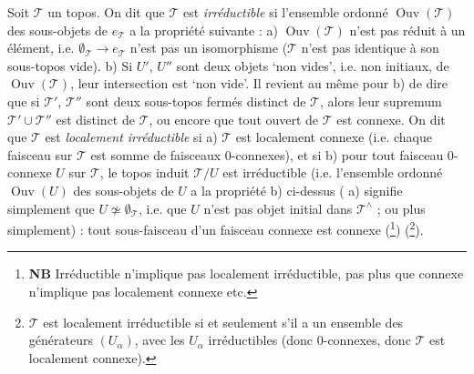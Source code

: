 Soit $\mathcal{T}$ un topos. On dit que $\mathcal{T}$ est \textit{irréductible} si l'ensemble ordonné $\operatorname{Ouv}(\mathcal{T})$ des sous-objets de $e_{\mathcal{T}}$ a la propriété suivante : a) $\operatorname{Ouv}(\mathcal{T})$ n'est pas réduit à un élément, i.e. $\emptyset_{\mathcal{T}} \longrightarrow e_{\mathcal{T}}$ n'est pas un isomorphisme ($\mathcal{T}$ n'est pas identique à son sous-topos vide). b) Si $U'$, $U''$ sont deux objets `non vides', i.e. non initiaux, de $\operatorname{Ouv}(\mathcal{T})$, leur intersection est `non vide'. Il revient au même pour b) de dire que si $\mathcal{T}'$, $\mathcal{T}''$ sont deux sous-topos fermés distinct de $\mathcal{T}$, alors leur supremum $\mathcal{T}' \cup \mathcal{T}''$ est distinct de $\mathcal{T}$, ou encore que tout ouvert de $\mathcal{T}$ est connexe. On dit que $\mathcal{T}$ est \textit{localement irréductible} si a) $\mathcal{T}$ est localement connexe (i.e. chaque faisceau sur $\mathcal{T}$ est somme de faisceaux 0-connexes), et si b) pour tout faisceau 0-connexe $U$ sur $\mathcal{T}$, le topos induit $\mathcal{T}/U$ est irréductible (i.e. l'ensemble ordonné $\operatorname{Ouv}(U)$ des sous-objets de $U$ a la propriété b) ci-dessus ( a) signifie simplement que $U \not\simeq \emptyset_{\mathcal{T}}$, i.e. que $U$ n'est pas objet initial dans $\mathcal{T}^\wedge$ ; ou plus simplement) : tout sous-faisceau d'un faisceau connexe est connexe (\footnote[5]{\textbf{NB} Irréductible n'implique pas localement irréductible, pas plus que connexe n'implique pas localement connexe etc.}) (\footnote[6]{$\mathcal{T}$ est localement irréductible si et seulement s'il a un ensemble des générateurs $(U_\alpha)$, avec les $U_\alpha$ irréductibles (donc 0-connexes, donc $\mathcal{T}$ est localement connexe).}).

